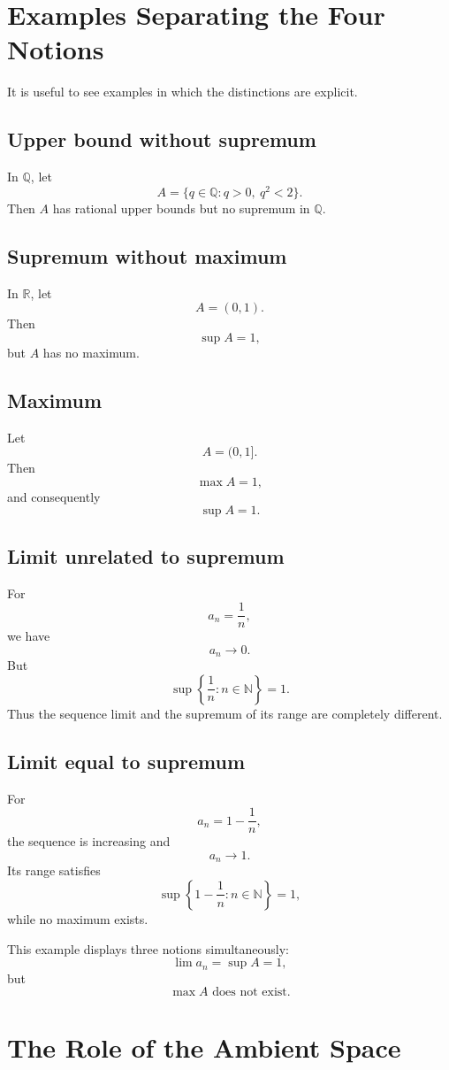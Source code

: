 \documentclass{essay}
\begin{document}
\section{Examples Separating the Four Notions}

It is useful to see examples in which the distinctions are explicit.

\subsection*{Upper bound without supremum}

In $\mathbb{Q}$, let
\[
    A=\{q\in\mathbb{Q}:q>0,\ q^2<2\}.
\]
Then $A$ has rational upper bounds but no supremum in $\mathbb{Q}$.

\subsection*{Supremum without maximum}

In $\mathbb{R}$, let
\[
    A=(0,1).
\]
Then
\[
    \sup A=1,
\]
but $A$ has no maximum.

\subsection*{Maximum}

Let
\[
    A=(0,1].
\]
Then
\[
    \max A=1,
\]
and consequently
\[
    \sup A=1.
\]

\subsection*{Limit unrelated to supremum}

For
\[
    a_n=\frac1n,
\]
we have
\[
    a_n\to0.
\]
But
\[
    \sup\left\{\frac1n:n\in\mathbb{N}\right\}=1.
\]
Thus the sequence limit and the supremum of its range are completely different.

\subsection*{Limit equal to supremum}

For
\[
    a_n=1-\frac1n,
\]
the sequence is increasing and
\[
    a_n\to1.
\]
Its range satisfies
\[
    \sup\left\{1-\frac1n:n\in\mathbb{N}\right\}=1,
\]
while no maximum exists.

This example displays three notions simultaneously:
\[
    \lim a_n=\sup A=1,
\]
but
\[
    \max A\text{ does not exist}.
\]

\section{The Role of the Ambient Space}
\end{document}
